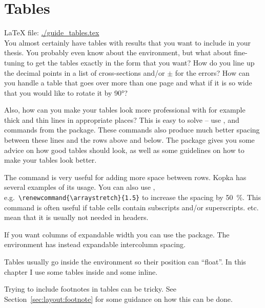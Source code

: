 
\chapter{Tables}
\label{sec:table}

\LaTeX{} file: \url{./guide_tables.tex}\\[1ex]
\noindent
You almost certainly have tables with results that you want to include
in your thesis. You probably even know about the 
environment, but what about fine-tuning to get the tables exactly in
the form that you want? How do you line up the decimal points in a
list of cross-sections and/or $\pm$ for the errors? How can you
handle a table that goes over more than one page and what if it is so
wide that you would like to rotate it by \ang{90}?

Also, how can you make your tables look more professional with for
example thick and thin lines in appropriate places? This is easy to
solve -- use ,  and 
commands from the  package. These commands also
produce much better spacing between these lines and the rows above and
below. The  package gives you some advice on how
good tables should look, as well as some guidelines on how to make your
tables look better.

The  command is very useful for adding more space between
rows. Kopka has several examples of its usage. You can also use
, e.g.\ \verb+\renewcommand{\arraystretch}{1.5}+ to
increase the spacing by \SI{50}{\percent}. This command is often useful if table
cells contain subscripts and/or superscripts. 
etc. mean that it is usually not needed in headers.

If you want columns of expandable width you can use the
 package. The environment  has instead
expandable intercolumn spacing.

Tables usually go inside the  environment so their position
can \enquote{float}. In this chapter I use some tables inside 
and some inline.

Trying to include footnotes in tables can be tricky. See
Section~\ref{sec:layout:footnote} for some guidance on how this can be done.


